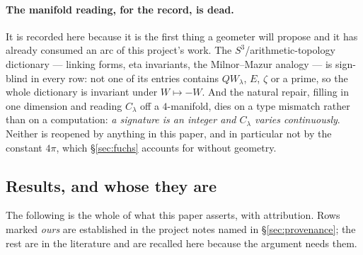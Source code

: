 \documentclass[11pt,a4paper]{article}
\theoremstyle{plain}
\theoremstyle{definition}
\theoremstyle{remark}
\newcommand{\R}{\mathbb{R}}
\newcommand{\Z}{\mathbb{Z}}
\newcommand{\Q}{\mathbb{Q}}
\newcommand{\A}{\mathbb{A}}
\newcommand{\E}{\mathcal{E}}
\newcommand{\F}{\mathcal{F}}
\newcommand{\QW}{QW}
\def\QW{QW}\def\E{E}\def\F{F}\def\R{R}\def\Q{Q}\def\Z{Z}\def\A{A}%
\begin{document}
\paragraph{The manifold reading, for the record, is dead.}  It is recorded here
because it is the first thing a geometer will propose and it has already
consumed an arc of this project's work.  The $S^3$/arithmetic-topology
dictionary --- linking forms, eta invariants, the Milnor--Mazur analogy --- is
sign-blind in every row: not one of its entries contains $\QW_\lambda$, $\E$,
$\zeta$ or a prime, so the whole dictionary is invariant under
$W\mapsto-W$.  And the natural repair, filling in one dimension and reading
$C_\lambda$ off a $4$-manifold, dies on a type mismatch rather than on a
computation: \emph{a signature is an integer and $C_\lambda$ varies
continuously}.  Neither is reopened by anything in this paper, and in particular
not by the constant $4\pi$, which \S\ref{sec:fuchs} accounts for without
geometry.

\subsection{Results, and whose they are}
\label{sec:whose}

The following is the whole of what this paper asserts, with attribution.  Rows
marked \emph{ours} are established in the project notes named in
\S\ref{sec:provenance}; the rest are in the literature and are recalled here
because the argument needs them.
\end{document}
